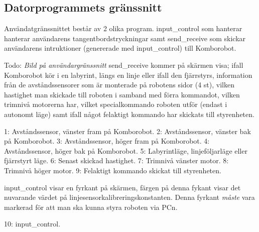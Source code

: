 
\subsection{Datorprogrammets gränssnitt}

Användatgränssnittet består av 2 olika program. input\_control som hanterar
hanterar användarens tangentbordstryckningar samt send\_receive som skickar
användarens intruktioner (genererade med input\_control) till Komborobot.

Todo: \emph{Bild på användargränssnitt}
send\_receive kommer på skärmen visa; ifall Komborobot kör i en labyrint, längs en linje eller ifall
den fjärrstyrs, information från de avståndssensorer som är monterade på
robotens sidor (4 st), vilken hastighet man skickade till roboten i samband med
förra kommandot, vilken trimnivå motorerna har, vilket specialkommando roboten
utför (endast i autonomt läge) samt ifall något felaktigt kommando har skickats
till styrenheten.

1: Avståndssensor, vänster fram på Komborobot.
2: Avståndssensor, vänster bak på Komborobot.
3: Avståndssensor, höger fram på Komborobot.
4: Avståndssensor, höger bak på Komborobot.
5: Labyrintläge, linjeföljarläge eller fjärrstyrt läge.
6: Senast skickad hastighet.
7: Trimnivå vänster motor.
8: Trimnivå höger motor.
9: Felaktigt kommando skickat till styrenheten.

input\_control visar en fyrkant på skärmen, färgen på denna fykant visar det
nuvarande värdet på linjesensorkalibreringskonstanten. Denna fyrkant
\emph{måste} vara markerad för att man ska kunna styra roboten via PCn.

10: input\_control.

